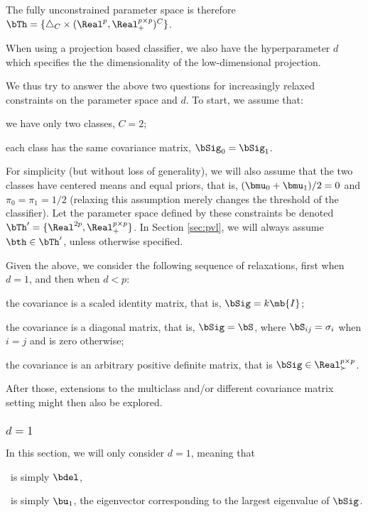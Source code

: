 \documentclass[10pt]{article}
\begin{document}
The fully unconstrained parameter space is therefore $\bTh=\{ \triangle_C \times (\Real^p, \Real^{p \times p}_+)^C \}$.

When using a projection based classifier, we also have the hyperparameter $d$ which specifies the the dimensionality of the low-dimensional projection.  

We thus try to answer the above two questions for increasingly relaxed constraints on the parameter space and $d$. To start, we assume that:
\begin{compactenum}
\item we have only two classes, $C=2$;
\item each class has the same covariance matrix, $\bSig_0=\bSig_1$.
\end{compactenum}

For simplicity (but without loss of generality), we will also assume that the two classes have centered means and equal priors, that is, $(\bmu_0+\bmu_1)/2=0$ and $\pi_0=\pi_1=1/2$ (relaxing this assumption merely changes the threshold of the classifier).  Let the parameter space defined by these constraints be denoted $\bTh' = \{\Real^{2p}, \Real_+^{p \times p} \}$. In Section \ref{sec:pvl}, we will always assume $\bth \in \bTh'$, unless otherwise specified.

Given the above, we consider the following sequence of relaxations, first when $d=1$, and then when $d < p$:
\begin{compactenum}
\item the covariance is a scaled identity matrix, that is, $\bSig=k \mb{I}$;
\item the covariance is a diagonal matrix, that is, $\bSig=\bS$, where $\bS_{ij}=\sigma_i$ when $i=j$ and is zero otherwise; 
\item the covariance is an arbitrary positive definite matrix, that is  $\bSig \in \Real^{p \times p}_\succ$.
\end{compactenum}

After those, extensions to the multiclass and/or different covariance matrix setting might then also be explored.








\subsubsection{$d=1$}

In this section, we will only consider $d=1$, meaning that
\begin{compactitem}
\item \Lol~is simply $\bdel$,
\item \Pca~is simply $\bu_1$, the eigenvector corresponding to the largest eigenvalue of $\bSig$.
\end{compactitem}
\end{document}
